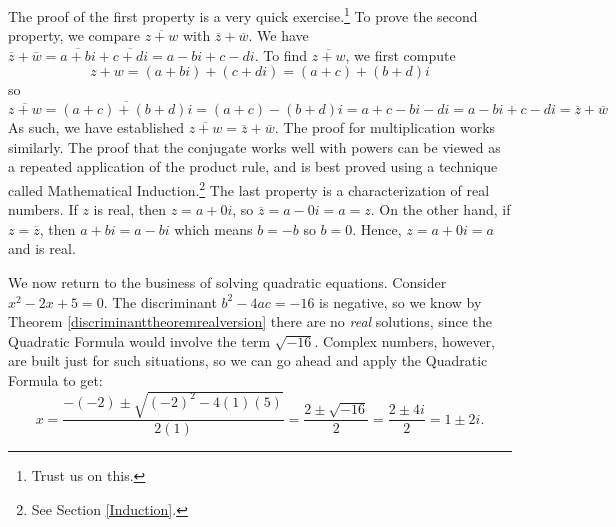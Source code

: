\documentclass{ximera}
\begin{document}
\smallskip

The proof of the first property is a very quick exercise.\footnote{Trust us on this.}  To prove the second property, we compare $\overline{z+w}$ with $\overline{z} + \overline{w}$.  We have $\overline{z} + \overline{w} = \overline{a+bi} + \overline{c+di}  = a-bi + c-di$.  To find $\overline{z+w}$, we first compute \[z+w = (a+bi) + (c+di) = (a+c)+(b+d)i\] so \[\overline{z+w} = \overline{(a+c)+(b+d)i} = (a+c) - (b+d)i = a+c - bi - di = a - bi + c - di = \overline{z} + \overline{w}\]  As such, we have established  $\overline{z+w} = \overline{z}+\overline{w}$. The proof for multiplication works similarly.  The proof that the conjugate works well with powers can be viewed as a repeated application of the product rule, and is best proved using a technique called Mathematical Induction.\footnote{See Section \ref{Induction}.}  The last property is a characterization of real numbers.  If $z$ is real, then $z = a + 0i$, so $\overline{z} = a - 0i = a = z$.  On the other hand, if $z=\overline{z}$, then $a+bi = a - bi$ which means $b=-b$ so $b=0$.  Hence, $z = a +0i = a$ and is real.

 

We now return to the business of solving quadratic equations. Consider  $x^2-2x+5 = 0$. The discriminant $b^2 - 4ac = -16$ is negative, so we know by Theorem \ref{discriminanttheoremrealversion} there are no \textit{real} solutions, since the Quadratic Formula would involve the term $\sqrt{-16}$.  Complex numbers, however, are built just for such situations, so we can go ahead and apply the Quadratic Formula to get: \[ x = \frac{-(-2) \pm \sqrt{(-2)^2-4(1)(5)}}{2(1)} = \frac{2 \pm \sqrt{-16}}{2} = \frac{2 \pm 4i}{2} = 1 \pm 2i.\]  
\end{document}
